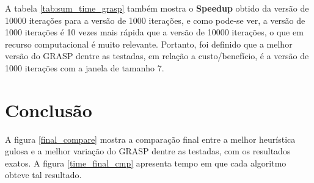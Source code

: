 \documentclass[a4paper, 12pt]{article}
\begin{document}
A tabela \ref{tab:sum_time_grasp} também mostra o \textbf{Speedup} obtido da versão de 10000 iterações para
a versão de 1000 iterações, e como pode-se ver, a versão de 1000 iterações é 10 vezes mais rápida que a versão
de 10000 iterações, o que em recurso computacional é muito relevante.
Portanto, foi definido que a melhor versão do GRASP dentre as testadas, em relação a custo/benefício,
é a versão de 1000 iterações com a janela de tamanho 7.



\section{Conclusão}

A figura \ref{final_compare} mostra a comparação final entre a melhor heurística gulosa e a melhor variação do GRASP
dentre as testadas, com os resultados exatos. A figura \ref{time_final_cmp} apresenta tempo em que cada
algoritmo obteve tal resultado.
\end{document}
